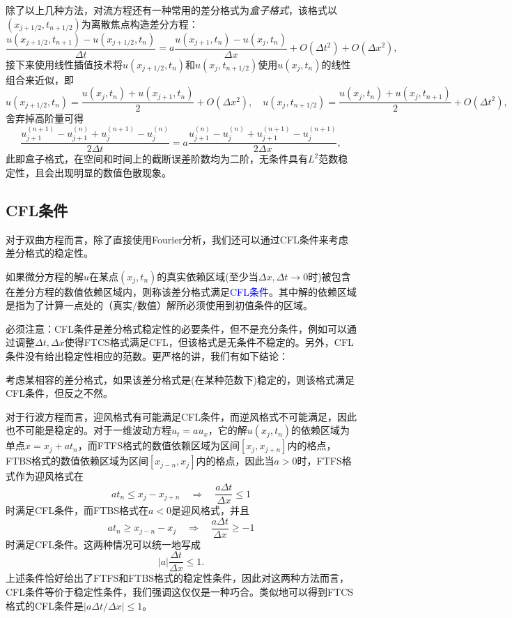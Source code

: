 \documentclass[a4paper,10pt]{ctexart}
\begin{document}
除了以上几种方法，对流方程还有一种常用的差分格式为\emph{盒子格式}，该格式以$ (x_{j+ 1 /2},t_{n+1 / 2}) $为离散焦点构造差分方程：
\[
    \frac{u(x_{j+1 / 2},t_{n+1}) - u(x_{j+1 / 2},t_n)}{\Delta t} = a \frac{u(x_{j+1},t_n) - u(x_{j},t_n)}{\Delta x} + O(\Delta t^2) + O(\Delta x^2),
\]
接下来使用线性插值技术将$ u(x_{j+1 / 2},t_n) $和$ u(x_j,t_{n+1 / 2}) $使用$ u(x_j,t_n) $的线性组合来近似，即
\[
    u(x_{j+1 / 2},t_n) = \frac{u(x_j,t_n)+u(x_{j+1},t_n)}{2}+O(\Delta x^2),\quad u(x_j,t_{n+1 / 2}) = \frac{u(x_j,t_n)+u(x_j,t_{n+1})}{2} + O(\Delta t^2),
\]
舍弃掉高阶量可得
\begin{equation}
    \frac{u^{(n+1)}_{j+1}-u^{(n)}_{j+1}+u^{(n+1)}_j-u^{(n)}_j}{2\Delta t} = a \frac{u^{(n)}_{j+1}-u^{(n)}_j+u^{(n+1)}_{j+1}-u^{(n+1)}_{j}}{2\Delta x},
\end{equation}
此即盒子格式，在空间和时间上的截断误差阶数均为二阶，无条件具有$ L^2 $范数稳定性，且会出现明显的数值色散现象。

\subsection{CFL条件}
对于双曲方程而言，除了直接使用Fourier分析，我们还可以通过CFL条件来考虑差分格式的稳定性。
\begin{definition}
    如果微分方程的解$ u $在某点$ (x_j,t_n) $的真实依赖区域(至少当$ \Delta x,\Delta t\to 0 $时)被包含在差分方程的数值依赖区域内，则称该差分格式满足\textcolor{blue}{CFL条件}。其中解的依赖区域是指为了计算一点处的（真实/数值）解所必须使用到初值条件的区域。
\end{definition}
必须注意：CFL条件是差分格式稳定性的必要条件，但不是充分条件，例如可以通过调整$ \Delta t, \Delta x $使得FTCS格式满足CFL，但该格式是无条件不稳定的。另外，CFL条件没有给出稳定性相应的范数。更严格的讲，我们有如下结论：
\begin{theorem}
    考虑某相容的差分格式，如果该差分格式是(在某种范数下)稳定的，则该格式满足CFL条件，但反之不然。
\end{theorem}

对于行波方程而言，迎风格式有可能满足CFL条件，而逆风格式不可能满足，因此也不可能是稳定的。对于一维波动方程$ u_t = au_x $，它的解$ u(x_j,t_n) $的依赖区域为单点$ x = x_j+at_n $，而FTFS格式的数值依赖区域为区间$ [x_j,x_{j+n}] $内的格点，FTBS格式的数值依赖区域为区间$ [x_{j-n},x_j] $内的格点，因此当$ a>0 $时，FTFS格式作为迎风格式在
\[
    at_n \leqslant x_j - x_{j+n} \quad \Rightarrow \quad \frac{a\Delta t}{\Delta x} \leqslant 1
\]
时满足CFL条件，而FTBS格式在$ a<0 $是迎风格式，并且
\[
    at_n \geqslant  x_{j-n} - x_j \quad \Rightarrow \quad \frac{a\Delta t}{\Delta x} \geqslant -1
\]
时满足CFL条件。这两种情况可以统一地写成
\[
    |a|\frac{\Delta t}{\Delta x} \leqslant 1.
\]
上述条件恰好给出了FTFS和FTBS格式的稳定性条件，因此对这两种方法而言，CFL条件等价于稳定性条件，我们强调这仅仅是一种巧合。类似地可以得到FTCS格式的CFL条件是$ |a\Delta t / \Delta x| \leqslant 1 $。
\end{document}
